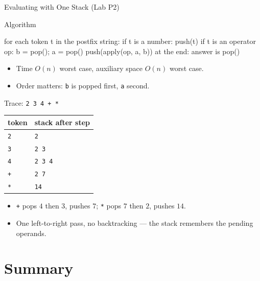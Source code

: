 \documentclass[aspectratio=169]{beamer}
\begin{document}
\begin{frame}[fragile]{Evaluating with One Stack (Lab P2)}
  \begin{block}{Algorithm}
\begin{semiverbatim}
for each token t in the postfix string:
    if t is a number: push(t)
    if t is an operator op:
        b = pop(); a = pop()
        push(apply(op, a, b))
at the end: answer is pop()
\end{semiverbatim}
  \end{block}
  \begin{itemize}
    \item Time $O(n)$ worst case, auxiliary space $O(n)$ worst case.
    \item Order matters: \texttt{b} is popped first, \texttt{a} second.
  \end{itemize}
\end{frame}

\begin{frame}{Trace: \texttt{2 3 4 + *}}
  \begin{center}
  \begin{tabular}{ll}
    \toprule
    \textbf{token} & \textbf{stack after step} \\
    \midrule
    \texttt{2} & \texttt{2} \\
    \texttt{3} & \texttt{2 3} \\
    \texttt{4} & \texttt{2 3 4} \\
    \texttt{+} & \texttt{2 7} \\
    \texttt{*} & \texttt{14} \\
    \bottomrule
  \end{tabular}
  \end{center}
  \begin{itemize}
    \item \texttt{+} pops $4$ then $3$, pushes $7$; \texttt{*} pops $7$ then
      $2$, pushes $14$.
    \item One left-to-right pass, no backtracking --- the stack remembers the
      pending operands.
  \end{itemize}
\end{frame}


\section{Summary}
\end{document}
